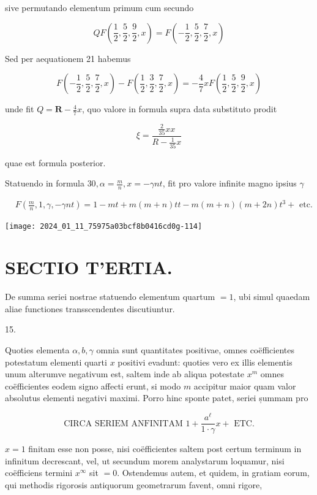 \documentclass[10pt]{article}
\begin{document}
sive permutando elementum primum cum secundo

\[
Q F\left(\frac{1}{2}, \frac{5}{2}, \frac{9}{2}, x\right)=F\left(-\frac{1}{2}, \frac{5}{2}, \frac{7}{2}, x\right)
\]

Sed per aequationem 21 habemus

\[
F\left(-\frac{1}{2}, \frac{5}{2}, \frac{7}{2}, x\right)-F\left(\frac{1}{2}, \frac{3}{2}, \frac{7}{2}, x\right)=-\frac{4}{7} x F\left(\frac{1}{2}, \frac{5}{2}, \frac{9}{2}, x\right)
\]

unde fit \(Q=\boldsymbol{R}-\frac{4}{7} x\), quo valore in formula supra data substituto prodit

\[
\xi=\frac{\frac{2}{35} x x}{R-\frac{1}{35} x}
\]

quae est formula posterior.

Statuendo in formula \(30, \alpha=\frac{m}{n}, x=-\gamma n t\), fit pro valore infinite magno ipsius \(\gamma\)

\[
\begin{aligned}
& F\left(\frac{m}{n}, 1, \gamma,-\gamma n t\right)=1-m t+m(m+n) t t-m(m+n)(m+2 n) t^{3}+\text { etc. }
\end{aligned}
\]

\begin{center}
\texttt{[image: 2024\_01\_11\_75975a03bcf8b0416cd0g-114]}
\end{center}

\section*{SECTIO T'ERTIA.}
De summa seriei nostrae statuendo elementum quartum \(=1\), ubi simul quaedam aliae functiones transscendentes discutiuntur.

15.

Quoties elementa \(\alpha, b, \gamma\) omnia sunt quantitates positivae, omnes coëfficientes potestatum elementi quarti \(x\) positivi evadunt: quoties vero ex illis elementis unum alterumve negativum est, saltem inde ab aliqua potestate \(x^{m}\) omnes coëfficientes eodem signo affecti erunt, si modo \(m\) accipitur maior quam valor absolutus elementi negativi maximi. Porro hinc sponte patet, seriei șummam pro

\[
\text { CIRCA SERIEM ANFINITAM } 1+\frac{a^{\ell}}{1 \cdot \gamma} x+\text { ETC. }
\]

\(x=1\) finitam esse non posse, nisi coëfficientes saltem post certum terminum in infinitum decrescant, vel, ut secundum morem analystarum loquamur, nisi coëfficiens termini \(x^{\infty}\) sit \(=0\). Ostendemus autem, et quidem, in gratiam eorum, qui methodis rigorosis antiquorum geometrarum favent, omni rigore,
\end{document}
